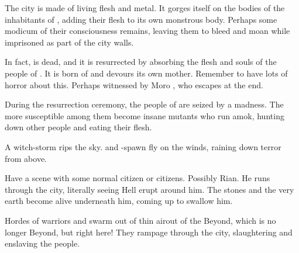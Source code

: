 The city is made of living flesh and metal. It gorges itself on the bodies of the inhabitants of \Malcur, adding their flesh to its own monstrous body. Perhaps some modicum of their consciousness remains, leaving them to bleed and moan while imprisoned as part of the city walls. 

In fact, \Nithdornazsh{} is dead, and it is resurrected by absorbing the flesh and souls of the people of \Malcur. It is born of \Malcur and devours its own mother. Remember to have lots of horror about this. Perhaps witnessed by Moro \Cobrel, who escapes at the end. 

During the resurrection ceremony, the people of \Malcur are seized by a madness. The more susceptible among them become insane mutants who run amok, hunting down other people and eating their flesh. 

A witch-storm rips the sky. \Pdaemons{} and \dragon-spawn fly on the winds, raining down terror from above. 

Have a scene with some normal \Malcuric{} citizen or citizens. Possibly Rian. He runs through the city, literally seeing Hell erupt around him. The stones and the very earth become alive underneath him, coming up to swallow him. 

Hordes of warriors and \pdaemons{} swarm out of thin air\dash out of the Beyond, which is no longer Beyond, but right here! They rampage through the city, slaughtering and enslaving the people. 




